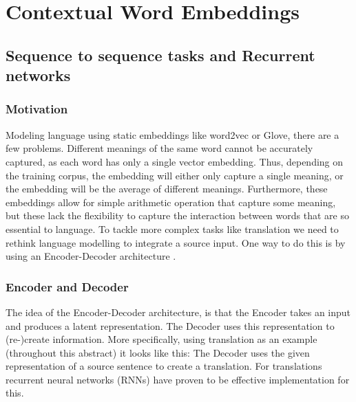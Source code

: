 \documentclass[11pt, a4paper]{amsart}
\begin{document}
\section{Contextual Word Embeddings}
\label{sec:contextual_word_embeddings}

\subsection{Sequence to sequence tasks and Recurrent networks}


\subsubsection{Motivation}

Modeling language using static embeddings like word2vec or Glove, there are a few problems. Different meanings of the same word cannot be accurately captured, as each word has only a single vector embedding. Thus, depending on the training corpus, the embedding will either only capture a single meaning, or the embedding will be the average of different meanings. Furthermore, these embeddings allow for simple arithmetic operation that capture some meaning, but these lack the flexibility to capture the interaction between words that are so essential to language. To tackle more complex tasks like translation we need to rethink language modelling to integrate a source input. One way to do this is by using an Encoder-Decoder architecture \cite{voitseq2seq}. 

\subsubsection{Encoder and Decoder}
The idea of the Encoder-Decoder architecture, is that the Encoder takes an input and produces a latent representation. The Decoder uses this representation to (re-)create information. More specifically, using translation as an example (throughout this abstract) it looks like this: The Decoder uses the given representation of a source sentence to create a translation. For translations recurrent neural networks (RNNs) have proven to be effective implementation for this.
\end{document}
